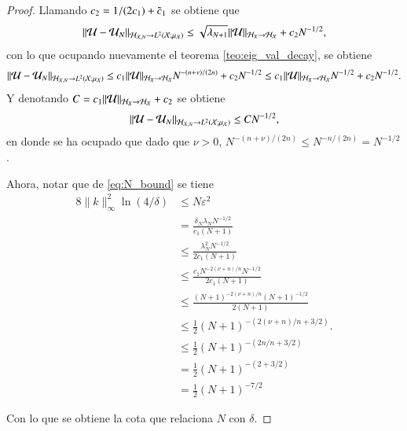 \begin{proof}
    Llamando $c_2 = 1/(2c_1) + \Tilde{c}_1$ se obtiene que 
    \[
    \|\mathcal{U} - \mathcal{U}_N \|_{\mathcal{H}_{\mathcal{X}, N} \to L^2(\mathcal{X}; \mu_{\mathcal{X}})} \leq \sqrt{\lambda_{N+1}} \|\mathcal{U} \|_{\mathcal{H}_{X} \to \mathcal{H_{\mathcal{X}}}} + c_2 N^{-1/2},
    \]
    con lo que ocupando nuevamente el teorema \ref{teo:eig_val_decay}, se obtiene
    \[
    \|\mathcal{U} - \mathcal{U}_N \|_{\mathcal{H}_{\mathcal{X}, N} \to L^2(\mathcal{X}; \mu_{\mathcal{X}})} \leq c_1 \|\mathcal{U} \|_{\mathcal{H}_{X} \to \mathcal{H_{\mathcal{X}}}} N^{-(n+\nu)/(2n)} + c_2 N^{-1/2} \leq c_1 \|\mathcal{U} \|_{\mathcal{H}_{X} \to \mathcal{H_{\mathcal{X}}}} N^{-1/2} + c_2 N^{-1/2}.
    \]
    Y denotando $C = c_1 \|\mathcal{U} \|_{\mathcal{H}_{X} \to \mathcal{H_{\mathcal{X}}}} + c_2$ se obtiene 
    \[
    \|\mathcal{U} - \mathcal{U}_N \|_{\mathcal{H}_{\mathcal{X}, N} \to L^2(\mathcal{X}; \mu_{\mathcal{X}})} \leq C N^{-1/2},
    \]
    en donde se ha ocupado que dado que $\nu > 0$, $N^{-(n+\nu)/(2n)} \leq N^{-n/(2n)} = N^{-1/2}$.

    Ahora, notar que de \ref{eq:N_bound} se tiene
    \[
    \begin{aligned}
        8\|k\|^2_\infty \ln(4/\delta) & \leq N \varepsilon^2 \\
        & = \frac{\delta_N \lambda_N N^{-1/2}}{c_1 (N+1)} \\
        & \leq \frac{\lambda_N^2 N^{-1/2}}{2c_1 (N+1)} \\
        & \leq \frac{c_1 N^{-2(\nu+n)/n} N^{-1/2}}{2c_1 (N+1)} \\
        & \leq \frac{ (N+1)^{-2(\nu+n)/n} (N+1)^{-1/2}}{2 (N+1)} \\
        & \leq \frac{1}{2} (N+1)^{-(2(\nu+n)/n + 3/2)}. \\
        & \leq \frac{1}{2} (N+1)^{-(2n/n + 3/2)} \\
        & = \frac{1}{2} (N+1)^{-(2 + 3/2)} \\
        & = \frac{1}{2} (N+1)^{-7/2}
    \end{aligned}
    \]

    Con lo que se obtiene la cota que relaciona $N$ con $\delta$.
\end{proof}



